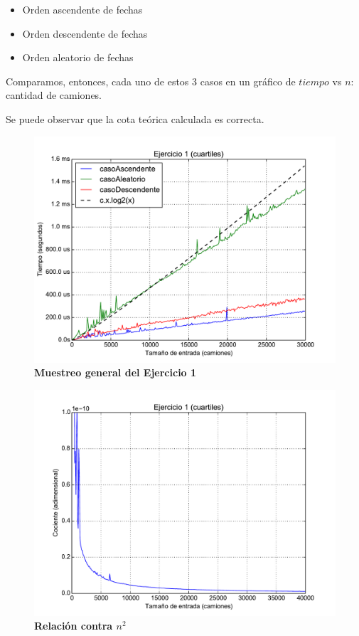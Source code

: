 \documentclass[11pt, a4paper, twoside]{article}
\begin{document}
\begin{itemize}
  \item Orden ascendente de fechas
  \item Orden descendente de fechas
  \item Orden aleatorio de fechas
\end{itemize}     

Comparamos, entonces, cada uno de estos $3$ casos en un gráfico de $tiempo$ vs $n$: cantidad de camiones. 

Se puede observar que la cota teórica calculada es correcta.

\clearpage
\begin{figure}[H]
   \begin{center}
   \includegraphics[width=1.4\textwidth,angle=90]{../ej1/graficos/test_1.pdf}
   \caption{\textbf{Muestreo general del Ejercicio 1}}
   \label{fig:ej1-1}
   \end{center}
\end{figure}

\clearpage
\begin{figure}[H]
   \begin{center}
   \includegraphics[width=1.4\textwidth,angle=90]{../ej1/graficos/test_2.pdf}
   \caption{\textbf{Relación contra $n^{2}$}}
   \label{fig:ej1-2}
   \end{center}
\end{figure}
\end{document}
